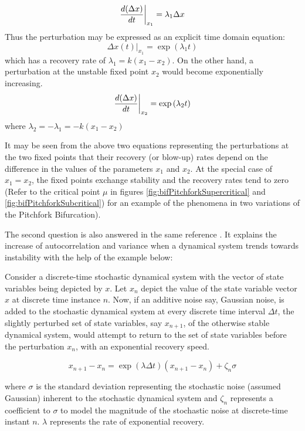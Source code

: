 \begin{equation}
	\evalat[\bigg]{\frac{d(\Delta x)}{dt}}{x_1} = \lambda_1 \Delta x 
\end{equation}
Thus the perturbation may be expressed as an explicit time domain equation:
\begin{equation}
	\Delta x(t)|_{x_1} = \exp{(\lambda_1 t)}
\end{equation}
which has a recovery rate of $\lambda_1 = k(x_1-x_2)$. On the other hand, a perturbation at the unstable fixed point $x_2$ would become exponentially increasing.
\begin{equation}
	\evalat[\bigg]{\frac{d(\Delta x)}{dt}}{x_2} = \exp{(\lambda_2 t)}
\end{equation}
 \hspace{25pt} where $\lambda_2 = -\lambda_1 = -k(x_1-x_2)$
 
It may be seen from the above two equations representing the perturbations at the two fixed points that their recovery (or blow-up) rates depend on the difference in the values of the parameters $x_1$ and $x_2$. At the special case of $x_1 = x_2$, the fixed points exchange stability and the recovery rates tend to zero (Refer to the critical point $\mu$ in figures \ref{fig:bifPitchforkSupercritical} and \ref{fig:bifPitchforkSubcritical}) for an example of the phenomena in two variations of the Pitchfork Bifurcation).

The second question is also answered in the same reference  \cite{schefferEarlyWarningSignalsForCriticalTransitions}. It explains the increase of autocorrelation and variance when a dynamical system trends towards instability with the help of the example below:

Consider a discrete-time stochastic dynamical system with the vector of state variables being depicted by $x$. Let $x_n$ depict the value of the state variable vector $x$ at discrete time instance $n$.
Now, if an additive noise say, Gaussian noise, is added to the stochastic dynamical system at every discrete time interval $\Delta t$, the slightly perturbed set of state variables, say $x_{n+1}$, of the otherwise stable dynamical system, would attempt to return to the set of state variables before the perturbation $x_n$, with an exponential recovery speed.

\begin{equation}
	x_{n+1} - x_{n} = \exp{(\lambda \Delta t)}(x_{n+1}-x_{n}) + \zeta_n\sigma
\end{equation}

\hspace{25pt} where $\sigma$ is the standard deviation representing the stochastic noise (assumed Gaussian) inherent to the stochastic dynamical system and $\zeta_n$ represents a coefficient to $\sigma$ to model the magnitude of the stochastic noise at discrete-time instant $n$. $\lambda$ represents the rate of exponential recovery.

